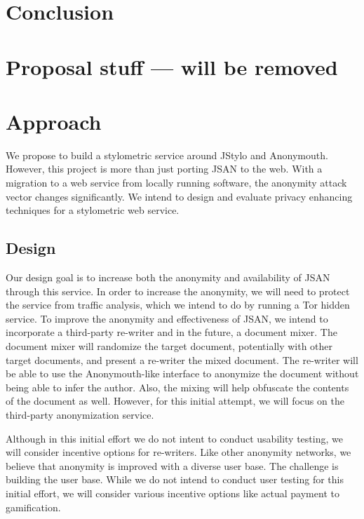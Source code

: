 \documentclass[letterpaper]{article}
\begin{document}
\section{Conclusion}


\section{Proposal stuff --- will be removed}


\section*{Approach}\label{sec:approach}

We propose to build a stylometric service around JStylo and
Anonymouth.  However, this project is more than just porting JSAN to
the web.  With a migration to a web service from locally running
software, the anonymity attack vector changes significantly.  We
intend to design and evaluate privacy enhancing techniques for
a stylometric web service.

\subsection{Design}

Our design goal is to increase both the anonymity and availability of
JSAN through this service.  In order to increase the anonymity, we
will need to protect the service from traffic analysis, which we
intend to do by running a Tor hidden service.  To improve the
anonymity and effectiveness of JSAN, we intend to incorporate a
third-party re-writer and in the future, a document mixer.  The
document mixer will randomize the target document, potentially with
other target documents, and present a re-writer the mixed document.
The re-writer will be able to use the Anonymouth-like interface to
anonymize the document without being able to infer the author.  Also,
the mixing will help obfuscate the contents of the document as well.
However, for this initial attempt, we will focus on the third-party
anonymization service.

Although in this initial effort we do not intent to conduct usability
testing, we will consider incentive options for re-writers.  Like
other anonymity networks, we believe that anonymity is improved with a
diverse user base.  The challenge is building the user base.  While we
do not intend to conduct user testing for this initial effort, we will
consider various incentive options like actual payment to
gamification.
\end{document}
